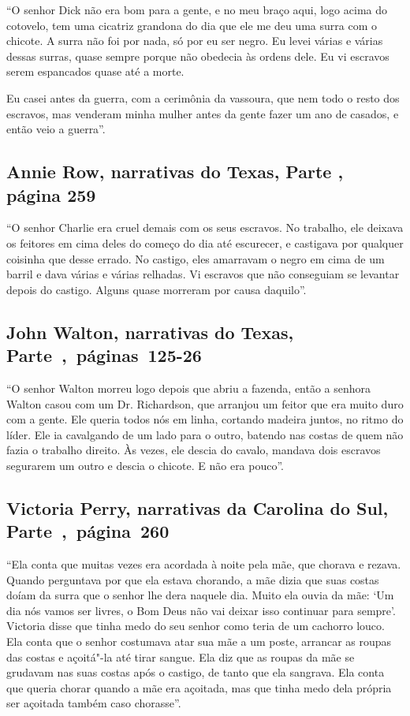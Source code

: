 ``O senhor Dick não era bom para a gente, e no meu braço aqui, logo
acima do cotovelo, tem uma cicatriz grandona do dia que ele me deu uma
surra com o chicote. A surra não foi por nada, só por eu ser negro. Eu
levei várias e várias dessas surras, quase sempre porque não obedecia às
ordens dele. Eu vi escravos serem espancados quase até a morte.

Eu casei antes da guerra, com a cerimônia da vassoura, que nem todo o
resto dos escravos, mas venderam minha mulher antes da gente fazer um
ano de casados, e então veio a guerra''.

\subsection{Annie Row, narrativas do Texas, Parte , página 259}
\label{ref230}

``O senhor Charlie era cruel demais com os seus escravos. No trabalho,
ele deixava os feitores em cima deles do começo do dia até escurecer, e
castigava por qualquer coisinha que desse errado. No castigo, eles
amarravam o negro em cima de um barril e dava várias e várias relhadas.
Vi escravos que não conseguiam se levantar depois do castigo. Alguns
quase morreram por causa daquilo''.

\subsection{John Walton, narrativas do Texas, Parte~,~páginas~125-26}
\label{ref274}

``O senhor Walton morreu logo depois que abriu a fazenda, então a
senhora Walton casou com um Dr. Richardson, que arranjou um feitor que
era muito duro com a gente. Ele queria todos nós em linha, cortando
madeira juntos, no ritmo do líder. Ele ia cavalgando de um lado para o
outro, batendo nas costas de quem não fazia o trabalho direito. Às
vezes, ele descia do cavalo, mandava dois escravos segurarem um outro e
descia o chicote. E não era pouco''.

\subsection{Victoria Perry, narrativas da Carolina do Sul, Parte~,~página~260}
\label{ref210}

``Ela conta que muitas vezes era acordada à noite pela mãe, que chorava
e rezava. Quando perguntava por que ela estava chorando, a mãe dizia que
suas costas doíam da surra que o senhor lhe dera naquele dia. Muito ela
ouvia da mãe: `Um dia nós vamos ser livres, o Bom Deus não vai deixar
isso continuar para sempre'. Victoria disse que tinha medo do seu senhor
como teria de um cachorro louco. Ela conta que o senhor costumava atar
sua mãe a um poste, arrancar as roupas das costas e açoitá"-la até tirar
sangue. Ela diz que as roupas da mãe se grudavam nas suas costas após o
castigo, de tanto que ela sangrava. Ela conta que queria chorar quando a
mãe era açoitada, mas que tinha medo dela própria ser açoitada também
caso chorasse''.

